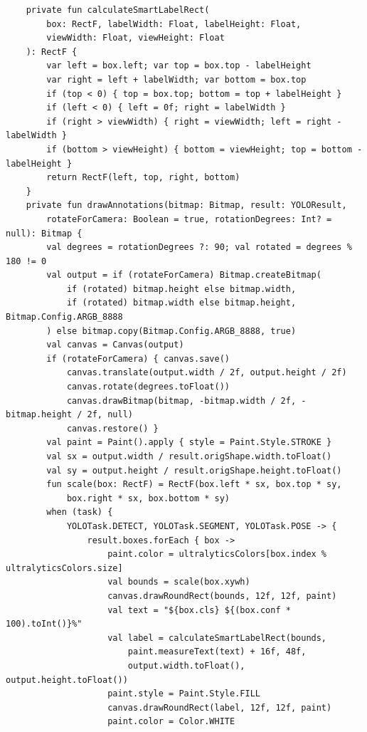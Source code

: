 \clearpage
\begingroup
\fontsize{6.5pt}{6.45pt}\selectfont
\begin{verbatim}
    private fun calculateSmartLabelRect(
        box: RectF, labelWidth: Float, labelHeight: Float,
        viewWidth: Float, viewHeight: Float
    ): RectF {
        var left = box.left; var top = box.top - labelHeight
        var right = left + labelWidth; var bottom = box.top
        if (top < 0) { top = box.top; bottom = top + labelHeight }
        if (left < 0) { left = 0f; right = labelWidth }
        if (right > viewWidth) { right = viewWidth; left = right - labelWidth }
        if (bottom > viewHeight) { bottom = viewHeight; top = bottom - labelHeight }
        return RectF(left, top, right, bottom)
    }
    private fun drawAnnotations(bitmap: Bitmap, result: YOLOResult,
        rotateForCamera: Boolean = true, rotationDegrees: Int? = null): Bitmap {
        val degrees = rotationDegrees ?: 90; val rotated = degrees % 180 != 0
        val output = if (rotateForCamera) Bitmap.createBitmap(
            if (rotated) bitmap.height else bitmap.width,
            if (rotated) bitmap.width else bitmap.height, Bitmap.Config.ARGB_8888
        ) else bitmap.copy(Bitmap.Config.ARGB_8888, true)
        val canvas = Canvas(output)
        if (rotateForCamera) { canvas.save()
            canvas.translate(output.width / 2f, output.height / 2f)
            canvas.rotate(degrees.toFloat())
            canvas.drawBitmap(bitmap, -bitmap.width / 2f, -bitmap.height / 2f, null)
            canvas.restore() }
        val paint = Paint().apply { style = Paint.Style.STROKE }
        val sx = output.width / result.origShape.width.toFloat()
        val sy = output.height / result.origShape.height.toFloat()
        fun scale(box: RectF) = RectF(box.left * sx, box.top * sy,
            box.right * sx, box.bottom * sy)
        when (task) {
            YOLOTask.DETECT, YOLOTask.SEGMENT, YOLOTask.POSE -> {
                result.boxes.forEach { box ->
                    paint.color = ultralyticsColors[box.index % ultralyticsColors.size]
                    val bounds = scale(box.xywh)
                    canvas.drawRoundRect(bounds, 12f, 12f, paint)
                    val text = "${box.cls} ${(box.conf * 100).toInt()}%"
                    val label = calculateSmartLabelRect(bounds,
                        paint.measureText(text) + 16f, 48f,
                        output.width.toFloat(), output.height.toFloat())
                    paint.style = Paint.Style.FILL
                    canvas.drawRoundRect(label, 12f, 12f, paint)
                    paint.color = Color.WHITE

\end{verbatim}
